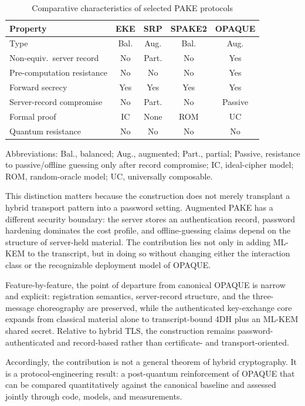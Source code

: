\documentclass[conference]{IEEEtran}
\begin{document}
\begin{table}[t]
\caption{Comparative characteristics of selected PAKE protocols}
\label{tab:acit-positioning}
\centering
\scriptsize
\setlength{\tabcolsep}{3.5pt}
\begin{tabularx}{\columnwidth}{@{}L{2.55cm}cccc@{}}
\toprule
Property & EKE & SRP & SPAKE2 & OPAQUE \\
\midrule
Type & Bal. & Aug. & Bal. & Aug. \\
Non-equiv.\ server record & No & Part. & No & Yes \\
Pre-computation resistance & No & No & No & Yes \\
Forward secrecy & Yes & Yes & Yes & Yes \\
Server-record compromise & No & Part. & No & Passive \\
Formal proof & IC & None & ROM & UC \\
Quantum resistance & No & No & No & No \\
\bottomrule
\end{tabularx}

{\scriptsize Abbreviations: Bal., balanced; Aug., augmented; Part., partial; Passive, resistance to passive/offline guessing only after record compromise; IC, ideal-cipher model; ROM, random-oracle model; UC, universally composable.}
\end{table}

This distinction matters because the construction does not merely transplant a hybrid transport pattern into a password setting. Augmented PAKE has a different security boundary: the server stores an authentication record, password hardening dominates the cost profile, and offline-guessing claims depend on the structure of server-held material. The contribution lies not only in adding ML-KEM to the transcript, but in doing so without changing either the interaction class or the recognizable deployment model of OPAQUE.

Feature-by-feature, the point of departure from canonical OPAQUE is narrow and explicit: registration semantics, server-record structure, and the three-message choreography are preserved, while the authenticated key-exchange core expands from classical material alone to transcript-bound 4DH plus an ML-KEM shared secret. Relative to hybrid TLS, the construction remains password-authenticated and record-based rather than certificate- and transport-oriented.

Accordingly, the contribution is not a general theorem of hybrid cryptography. It is a protocol-engineering result: a post-quantum reinforcement of OPAQUE that can be compared quantitatively against the canonical baseline and assessed jointly through code, models, and measurements.
\end{document}
